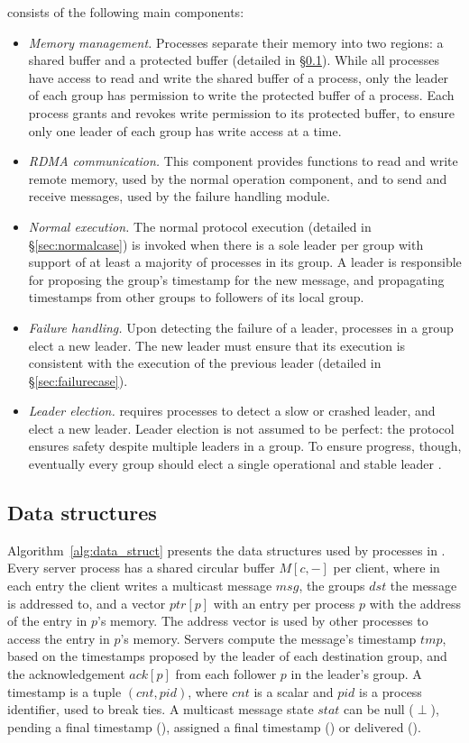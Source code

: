 \libname consists of the following main components:
\begin{itemize}
  \item \emph{Memory management.} Processes separate their memory into two regions: a shared buffer and a protected buffer (detailed in \S\ref{sec:ds-structs}). While all processes have access to read and write the shared buffer of a process, only the leader of each group has permission to write the protected buffer of a process. Each process grants and revokes write permission to its protected buffer, to ensure only one leader of each group has write access at a time.
  \item \emph{RDMA communication.} This component provides functions to read and write remote memory, used by the normal operation component, and to send and receive messages, used by the failure handling module.
  \item \emph{Normal execution.} The normal protocol execution (detailed in \S\ref{sec:normalcase}) is invoked when there is a sole leader per group with support of at least a majority of processes in its group. A leader is responsible for proposing the group's timestamp for the new message, and propagating timestamps from other groups to followers of its local group.
  \item \emph{Failure handling.} Upon detecting the failure of a leader, processes in a group elect a new leader. The new leader must ensure that its execution is consistent with the execution of the previous leader (detailed in \S\ref{sec:failurecase}).
  \item \emph{Leader election.} \libname requires processes to detect a slow or crashed leader, and elect a new leader. Leader election is not assumed to be perfect: the protocol ensures safety despite multiple leaders in a group. To ensure progress, though, eventually every group should elect a single operational and stable leader \cite{Aguilera2019,L98}.
\end{itemize}

\subsection{Data structures}
\label{sec:ds-structs}

Algorithm~\ref{alg:data_struct} presents the data structures used by processes in \libname.
Every server process has a shared circular buffer $M[c,-]$ per client, where in each entry the client writes a multicast message $msg$, the groups $dst$ the message is addressed to, and a vector $ptr[p]$ with an entry per process $p$ with the address of the entry in $p$'s memory. The address vector is used by other processes to access the entry in $p$'s memory.
Servers compute the message's timestamp $tmp$, based on the timestamps proposed by the leader of each destination group, and the acknowledgement $ack[p]$ from each follower $p$ in the leader's group.
A timestamp is a tuple $(cnt,pid)$, where $cnt$ is a scalar and $pid$ is a process identifier, used to break ties.
A multicast message state $stat$ can be null ($\perp$), pending a final timestamp (\mcast), assigned a final timestamp (\ordered) or delivered (\done).


